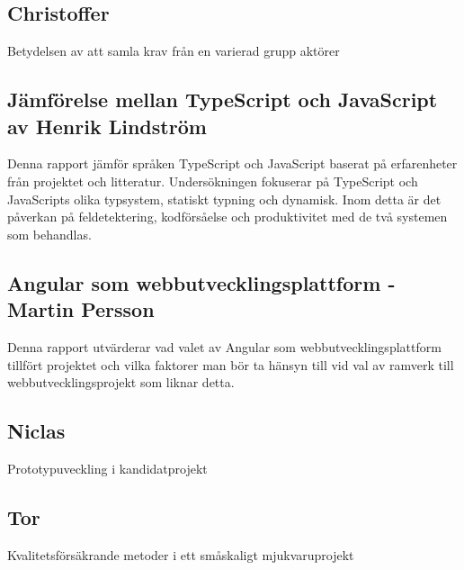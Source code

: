\subsection{Christoffer}
Betydelsen av att samla krav från en varierad grupp aktörer
\subsection{Jämförelse mellan TypeScript och JavaScript av Henrik Lindström}
Denna rapport jämför språken TypeScript och JavaScript baserat på erfarenheter från projektet och litteratur. Undersökningen fokuserar på TypeScript och JavaScripts olika typsystem, statiskt typning och dynamisk. Inom detta är det påverkan på feldetektering, kodförsåelse och produktivitet med de två systemen som behandlas.
\subsection{Angular som webbutvecklingsplattform - Martin Persson}
Denna rapport utvärderar vad valet av Angular som webbutvecklingsplattform tillfört projektet och vilka faktorer man bör ta hänsyn till vid val av ramverk till webbutvecklingsprojekt som liknar detta.  
\subsection{Niclas}
Prototypuveckling i kandidatprojekt
\subsection{Tor}
Kvalitetsförsäkrande metoder i ett småskaligt mjukvaruprojekt
